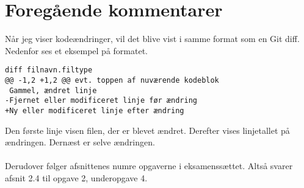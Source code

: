 \setcounter{section}{-1}
\section{Foregående kommentarer}

Når jeg viser kodeændringer, vil det blive vist i samme format som en Git diff. Nedenfor ses et eksempel på formatet.

\begin{verbatim}
diff filnavn.filtype
@@ -1,2 +1,2 @@ evt. toppen af nuværende kodeblok
 Gammel, ændret linje
-Fjernet eller modificeret linje før ændring
+Ny eller modificeret linje efter ændring
\end{verbatim}

Den første linje visen filen, der er blevet ændret. Derefter vises linjetallet på ændringen. Dernæst er selve ændringen.
\\\\
Derudover følger afsnittenes numre opgaverne i eksamenssættet. Altså svarer afsnit 2.4 til opgave 2, underopgave 4.
